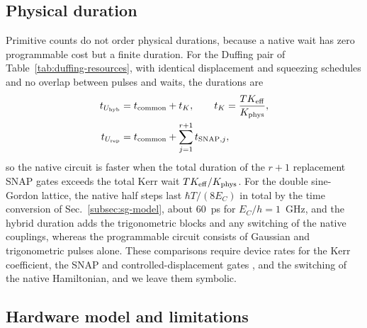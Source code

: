 \documentclass[pra,twocolumn,superscriptaddress,nofootinbib,floatfix]{revtex4-2}
\theoremstyle{remark}
\newcommand{\revcolor}{\color{blue}}
\DeclareRobustCommand{\rev}[1]{{\revcolor #1}}
\begin{document}
\subsection{\rev{Physical duration}}
\label{subsec:duration}

\rev{Primitive counts do not order physical durations, because a native wait has zero programmable cost but a finite duration.} \rev{For the Duffing pair of Table~\ref{tab:duffing-resources}, with identical displacement and squeezing schedules and no overlap between pulses and waits, the durations are}
\begingroup\revcolor
\begin{align}
t_{U_{\rm hyb}}&=t_{\rm common}+t_K,\qquad t_K=\frac{T K_{\rm eff}}{K_{\rm phys}},\nonumber\\
t_{U_{\rm rep}}&=t_{\rm common}+\sum_{j=1}^{r+1}t_{{\rm SNAP},j},
\label{eq:break-even}
\end{align}
\endgroup
\rev{so the native circuit is faster when the total duration of the \(r+1\) replacement SNAP gates exceeds the total Kerr wait \(TK_{\rm eff}/K_{\rm phys}\).} \rev{For the double sine-Gordon lattice, the native half steps last \(\hbar T/(8E_C)\) in total by the time conversion of Sec.~\ref{subsec:sg-model}, about 60~ps for \(E_C/h=1\)~GHz, and the hybrid duration adds the trigonometric blocks and any switching of the native couplings, whereas the programmable circuit consists of Gaussian and trigonometric pulses alone.} \rev{These comparisons require device rates for the Kerr coefficient, the SNAP and controlled-displacement gates \cite{Heeres_2015,Eickbusch2022ECD}, and the switching of the native Hamiltonian, and we leave them symbolic.}

\subsection{\rev{Hardware model and limitations}}
\label{subsec:hardware}
\end{document}
